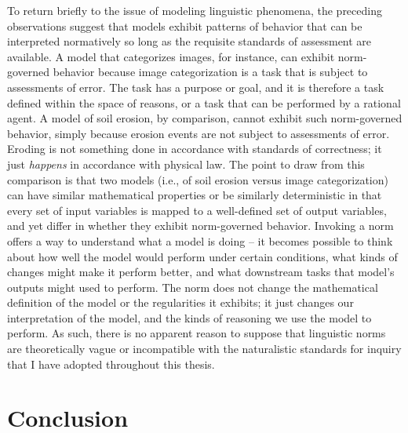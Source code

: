 To return briefly to the issue of modeling linguistic phenomena, the preceding observations suggest that models exhibit patterns of behavior that can be interpreted normatively so long as the requisite standards of assessment are available. A model that categorizes images, for instance, can exhibit norm-governed behavior because image categorization is a task that is subject to assessments of error. The task has a purpose or goal, and it is therefore a task defined within the space of reasons, or a task that can be performed by a rational agent. A model of soil erosion, by comparison, cannot exhibit such norm-governed behavior, simply because erosion events are not subject to assessments of error. Eroding is not something done in accordance with standards of correctness; it just \textit{happens} in accordance with physical law. The point to draw from this comparison is that two models (i.e., of soil erosion versus image categorization) can have similar mathematical properties or be similarly deterministic in that every set of input variables is mapped to a well-defined set of output variables, and yet differ in whether they exhibit norm-governed behavior. Invoking a norm offers a way to understand what a model is doing -- it becomes possible to think about how well the model would perform under certain conditions, what kinds of changes might make it perform better, and what downstream tasks that model's outputs might used to perform. The norm does not change the mathematical definition of the model or the regularities it exhibits; it just changes our interpretation of the model, and the kinds of reasoning we use the model to perform. As such, there is no apparent reason to suppose that linguistic norms are theoretically vague or incompatible with the naturalistic standards for inquiry that I have adopted throughout this thesis.

\section{Conclusion}

